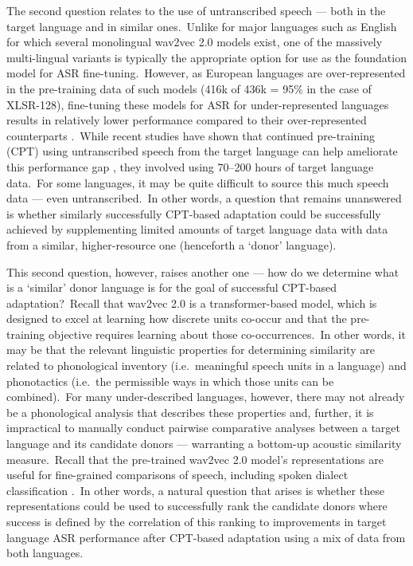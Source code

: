 \documentclass[main.tex]{subfiles}
\begin{document}
The second question relates to the use of untranscribed speech --- both in the target language and in similar ones.~Unlike for major languages such as English for which several monolingual wav2vec 2.0 models exist, one of the massively multi-lingual variants is typically the appropriate option for use as the foundation model for ASR fine-tuning.~However, as European languages are over-represented in the pre-training data of such models (416k of 436k = 95\% in the case of XLSR-128), fine-tuning these models for ASR for under-represented languages results in relatively lower performance compared to their over-represented counterparts \parencite{conneau2023fleurs}.~While recent studies have shown that continued pre-training (CPT) using untranscribed speech from the target language can help ameliorate this performance gap \parencite[e.g.~][]{NOWAKOWSKI2023103148,paraskevopoulos2024sample}, they involved using 70–200 hours of target language data.~For some languages, it may be quite difficult to source this much speech data --- even untranscribed.~In other words, a question that remains unanswered is whether similarly successfully CPT-based adaptation could be successfully achieved by supplementing limited amounts of target language data with data from a similar, higher-resource one (henceforth a `donor' language).

This second question, however, raises another one --- how do we determine what is a `similar' donor language is for the goal of successful CPT-based adaptation?~Recall that wav2vec 2.0 is a transformer-based model, which is designed to excel at learning how discrete units co-occur and that the pre-training objective requires learning about those co-occurrences.~In other words, it may be that the relevant linguistic properties for determining similarity are related to phonological inventory (i.e.~meaningful speech units in a language) and phonotactics (i.e.~the permissible ways in which those units can be combined).~For many under-described languages, however, there may not already be a phonological analysis that describes these properties and, further, it is impractical to manually conduct pairwise comparative analyses between a target language and its candidate donors --- warranting a bottom-up acoustic similarity measure.~Recall that the pre-trained wav2vec 2.0 model's representations are useful for fine-grained comparisons of speech, including spoken dialect classification \parencite{bartelds2022quantifying,guillaume23_sigul}.~In other words, a natural question that arises is whether these representations could be used to successfully rank the candidate donors where success is defined by the correlation of this ranking to improvements in target language ASR performance after CPT-based adaptation using a mix of data from both languages.
\end{document}
